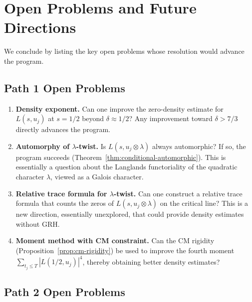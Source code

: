 \documentclass[11pt,a4paper]{article}
\theoremstyle{plain}
\theoremstyle{definition}
\begin{document}
\section{Open Problems and Future Directions}
\label{sec:open}

We conclude by listing the key open problems whose resolution would advance the program.

\subsection{Path 1 Open Problems}

\begin{enumerate}[label=\textbf{OP1.\arabic*:}]
\item \textbf{Density exponent.} Can one improve the zero-density estimate for $L(s, u_j)$ at $s = 1/2$ beyond $\delta \approx 1/2$? Any improvement toward $\delta > 7/3$ directly advances the program.

\item \textbf{Automorphy of $\lambda$-twist.} Is $L(s, u_j \otimes \lambda)$ always automorphic? If so, the program succeeds (Theorem~\ref{thm:conditional-automorphic}). This is essentially a question about the Langlands functoriality of the quadratic character $\lambda$, viewed as a Galois character.

\item \textbf{Relative trace formula for $\lambda$-twist.} Can one construct a relative trace formula that counts the zeros of $L(s, u_j \otimes \lambda)$ on the critical line? This is a new direction, essentially unexplored, that could provide density estimates without GRH.

\item \textbf{Moment method with CM constraint.} Can the CM rigidity (Proposition~\ref{prop:cm-rigidity}) be used to improve the fourth moment $\sum_{t_j \leq T} |L(1/2, u_j)|^4$, thereby obtaining better density estimates?
\end{enumerate}

\subsection{Path 2 Open Problems}
\end{document}
